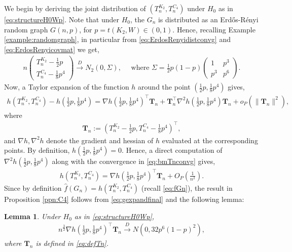 \documentclass[11pt,reqno]{amsart}
\numberwithin{equation}{section}
\newcommand\dto{\overset{D}{\rightarrow}}
\newtheorem{lemma}{Lemma}[section]
\theoremstyle{definition}
\begin{document}
We begin by deriving the joint distribution of $(T_{n}^{K_2},T_{n}^{C_4})$ under $H_0$ as in \eqref{eq:structureH0Wp}. Note that under $H_0$, the $G_n$ is distributed as an Erd\H{o}s-R\'enyi random graph $G(n, p)$, for $p = t(K_{2}, W) \in (0, 1)$. Hence, recalling Example \ref{example:randomgraph}, in particular from \eqref{eq:ErdosRenyidistconvg} and \eqref{eq:ErdosRenyicovmat} we get, 
\begin{align}\label{eq:bmTnconvg}
    n \begin{pmatrix}
    T_{n}^{K_2} - \tfrac{1}{2} p \\ 
    T_{n}^{C_4} - \tfrac{1}{8} p^4 
    \end{pmatrix}
    \dto N_2(0,\Sigma), \quad \text{ where }\Sigma  = \tfrac{1}{2}p(1-p)
    \begin{pmatrix}
    1 & p^{3}\\
    p^{3} & p^{6}
    \end{pmatrix} .
\end{align}
Now, a Taylor expansion of the function $h$ around the point $(\tfrac{1}{2} p,\tfrac{1}{8} p^4)$ gives,
\begin{align*}
    h(T_{n}^{K_2},T_{n}^{C_4}) - h(\tfrac{1}{2} p,\tfrac{1}{8} p^4) = \nabla h(\tfrac{1}{2} p,\tfrac{1}{8} p^4)^{\top}\bm{T}_{n} + \bm{T}_{n}^{\top}\nabla^{2}h(\tfrac{1}{2} p,\tfrac{1}{8} p^4)\bm{T}_{n}
    + o_P\left(\|\bm{T}_{n}\|^{2}\right) , 
\end{align*}
where
\begin{align}\label{eq:defTn}
    \bm T_n := \left(T_{n}^{K_2} - \tfrac{1}{2} p,T_{n}^{C_4} - \tfrac{1}{8} p^4\right)^{\top} ,
\end{align}
and $\nabla h, \nabla^2 h$ denote the gradient and hessian of $h$ evaluated at the corresponding points. By definition, $h(\tfrac{1}{2} p, \tfrac{1}{8} p^4) = 0$. Hence, a direct computation of $\nabla^{2}h(\tfrac{1}{2} p,\tfrac{1}{8} p^4)$ along with the convergence in \eqref{eq:bmTnconvg} gives,
\begin{align}\label{eq:gexpandfinal}
    h(T_{n}^{K_2},T_{n}^{C_4}) = \nabla h(\tfrac{1}{2} p,\tfrac{1}{8} p^4)^{\top}\bm{T}_{n} + O_P\left( \frac{1}{n^{2}} \right) .
\end{align}
Since by definition $\hat f(G_n) = h(T_{n}^{K_2},T_{n}^{C_4})$ (recall \eqref{eq:fGn}), the result in Proposition \ref{ppn:C4} follows from \eqref{eq:gexpandfinal} and the following lemma: 

\begin{lemma}\label{lemma:convgderivativeg}
    Under $H_0$ as in \eqref{eq:structureH0Wp},
    \begin{align*}
        n^\frac{3}{2}\nabla h(\tfrac{1}{2} p,\tfrac{1}{8} p^4)^{\top}\bm{T}_{n}\dto N\left(0, 32p^6(1-p)^2\right) , 
    \end{align*}
    where $\bm T_n$ is defined in \eqref{eq:defTn}.
\end{lemma}
\end{document}
